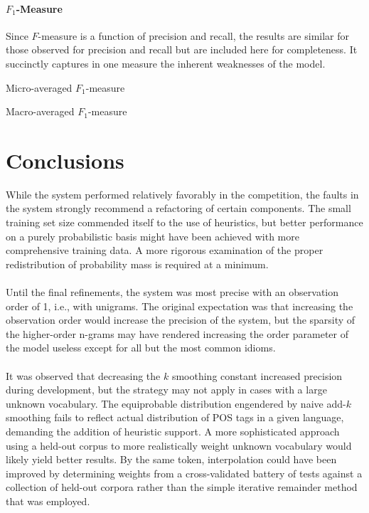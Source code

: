 \documentclass[11pt,a4paper]{article}
\begin{document}
\paragraph{$F_{1}$-Measure}

Since $F$-measure is a function of precision and recall, the results are
similar for those observed for precision and recall but are included
here for completeness. It succinctly captures in one measure the
inherent weaknesses of the model.

{\center\footnotesize Micro-averaged $F_{1}$-measure\\}
{\tiny\pgfplotstabletypeset[header=true]{\fmicro}}

{\center\footnotesize Macro-averaged $F_{1}$-measure\\}
{\tiny\pgfplotstabletypeset[header=true]{\fmacro}}


\section{Conclusions}

While the system performed relatively favorably in the competition,
the faults in the system strongly recommend a refactoring of certain
components. The small training set size commended itself to the
use of heuristics, but better performance on a purely probabilistic
basis might have been achieved with more comprehensive training data.
A more rigorous examination of the proper redistribution of probability
mass is required at a minimum.

\paragraph{}
Until the final refinements, the system was most precise with an
observation order of 1, i.e., with unigrams. The original expectation
was that increasing the observation order would increase the precision
of the system, but the sparsity of the higher-order n-grams may have
rendered increasing the order parameter of the model useless except
for all but the most common idioms.

\paragraph{}
It was observed that decreasing the $k$ smoothing constant increased precision during development,
but the strategy may not apply in cases with a large unknown vocabulary. The equiprobable
distribution engendered by naive add-$k$ smoothing fails to reflect actual
distribution of POS tags in a given language, demanding the addition
of heuristic support. A more sophisticated approach using a held-out
corpus to more realistically weight unknown vocabulary would likely yield better results.
By the same token, interpolation could have been improved by determining weights
from a cross-validated battery of tests against a collection of held-out corpora rather
than the simple iterative remainder method that was employed.
\end{document}
